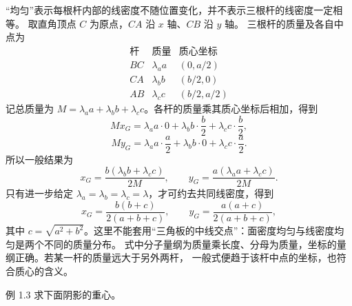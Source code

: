 \documentclass[UTF8,zihao=-4,oneside,openany]{ctexbook}
\newenvironment{xesolution}{%
  \par\smallskip
  \begingroup\small
  \noindent{\bfseries\color{DeepBlue}解答}\quad
}{%
  \par\endgroup\medskip
}
\begin{document}
\begin{xesolution}
“均匀”表示每根杆内部的线密度不随位置变化，并不表示三根杆的线密度一定相等。
取直角顶点 $C$ 为原点，$CA$ 沿 $x$ 轴、$CB$ 沿 $y$ 轴。
三根杆的质量及各自中点为
\[
\begin{array}{c|c|c}
\text{杆} & \text{质量} & \text{质心坐标}\\ \hline
BC & \lambda_a a &(0,a/2)\\
CA & \lambda_b b &(b/2,0)\\
AB & \lambda_c c &(b/2,a/2)
\end{array}
\]
记总质量为 $M=\lambda_a a+\lambda_b b+\lambda_c c$。各杆的质量乘其质心坐标后相加，得到
\[
 Mx_G=\lambda_a a\cdot0+\lambda_b b\cdot\frac b2+\lambda_c c\cdot\frac b2,
\]
\[
 My_G=\lambda_a a\cdot\frac a2+\lambda_b b\cdot0+\lambda_c c\cdot\frac a2.
\]
所以一般结果为
\[
 \boxed{x_G=\frac{b(\lambda_b b+\lambda_c c)}{2M},\qquad
 y_G=\frac{a(\lambda_a a+\lambda_c c)}{2M}}.
\]
只有进一步给定 $\lambda_a=\lambda_b=\lambda_c=\lambda$，才可约去共同线密度，得到
\[
  \boxed{x_G=\frac{b(b+c)}{2(a+b+c)},\qquad
  y_G=\frac{a(a+c)}{2(a+b+c)}} ,
\]
其中 $c=\sqrt{a^2+b^2}$。这里不能套用“三角板的中线交点”：面密度均匀与线密度均匀是两个不同的质量分布。
式中分子量纲为质量乘长度、分母为质量，坐标的量纲正确。若某一杆的质量远大于另外两杆，
一般式便趋于该杆中点的坐标，也符合质心的含义。
\end{xesolution}

\begin{origexamplebox}{例 1.3}
求下面阴影的重心。

\begin{center}
\end{center}
\end{origexamplebox}
\end{document}
